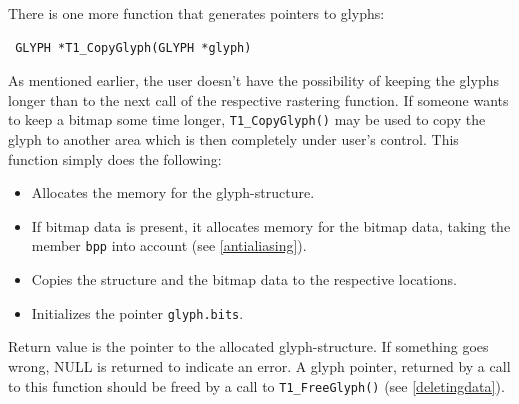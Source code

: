There is one more function that generates pointers to glyphs:
\precorr
\begin{verbatim}
 GLYPH *T1_CopyGlyph(GLYPH *glyph)
\end{verbatim}\postcorr
As mentioned earlier, the user doesn't have the possibility of keeping
the  
glyphs longer than to the next call of the respective rastering function. If 
someone wants to keep a bitmap some time longer,  
\verb+T1_CopyGlyph()+ may be used
to copy the glyph to another area which is then completely under user's
control. This function simply does the following:
\begin{itemize}
\item Allocates the memory for the glyph-structure.
\item If bitmap data is present, it allocates memory for the bitmap data,
  taking the member \verb+bpp+ into account (see \ref{antialiasing}).
\item Copies the structure and the bitmap data to the respective locations.
\item Initializes the pointer \verb+glyph.bits+.
\end{itemize}

Return value is the pointer to the allocated glyph-structure. If something
goes wrong, NULL is returned to indicate an error. A glyph pointer,
returned by a call to this function should be freed by a call to
\verb+T1_FreeGlyph()+ (see \ref{deletingdata}).


